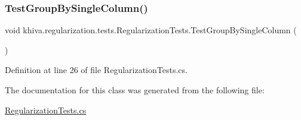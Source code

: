 \subsubsection{\texorpdfstring{Test\+Group\+By\+Single\+Column()}{TestGroupBySingleColumn()}}
{\footnotesize\ttfamily void khiva.\+regularization.\+tests.\+Regularization\+Tests.\+Test\+Group\+By\+Single\+Column (\begin{DoxyParamCaption}{ }\end{DoxyParamCaption})\hspace{0.3cm}{\ttfamily [inline]}}



Definition at line 26 of file Regularization\+Tests.\+cs.



The documentation for this class was generated from the following file\+:\begin{DoxyCompactItemize}
\item 
\mbox{\hyperlink{_regularization_tests_8cs}{Regularization\+Tests.\+cs}}\end{DoxyCompactItemize}
